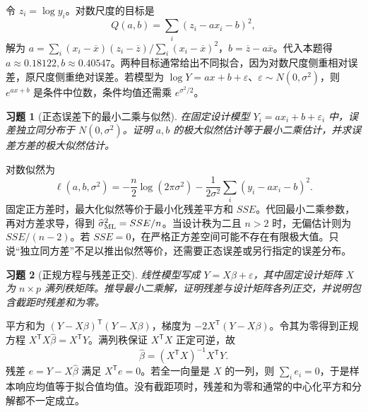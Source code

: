 \documentclass[UTF8,12pt,a4paper,fontset=fandol]{ctexart}
\newtheorem{exercise}{习题}[section]
\begin{document}
\begin{solve}\label{a:M-C26-1c}令 $z_i=\log y_i$。对数尺度的目标是\[Q(a,b)=\sum_i(z_i-ax_i-b)^2,\]解为 $a=\sum_i(x_i-\overline x)(z_i-\overline z)/\sum_i(x_i-\overline x)^2$，$b=\overline z-a\overline x$。代入本题得 $a\approx0.18122,b\approx0.40547$。两种目标通常给出不同拟合，因为对数尺度侧重相对误差，原尺度侧重绝对误差。若模型为 $\log Y=ax+b+\varepsilon$、$\varepsilon\sim N(0,\sigma^2)$，则 $e^{ax+b}$ 是条件中位数，条件均值还需乘 $e^{\sigma^2/2}$。\end{solve}

\begin{exercise}[正态误差下的最小二乘与似然]\label{q:M-C26-2d}
在固定设计模型 $Y_i=ax_i+b+\varepsilon_i$ 中，误差独立同分布于 $N(0,\sigma^2)$。证明 $a,b$ 的极大似然估计等于最小二乘估计，并求误差方差的极大似然估计。\par{}
\end{exercise}

\begin{solve}\label{a:M-C26-2d}对数似然为\[\ell(a,b,\sigma^2)=-\frac n2\log(2\pi\sigma^2)-\frac{1}{2\sigma^2}\sum_i(y_i-ax_i-b)^2.\]固定正方差时，最大化似然等价于最小化残差平方和 $SSE$。代回最小二乘参数，再对方差求导，得到 $\widehat\sigma^2_{\rm ML}=SSE/n$。当设计秩为二且 $n>2$ 时，无偏估计则为 $SSE/(n-2)$。若 $SSE=0$，在严格正方差空间可能不存在有限极大值。只说“独立同方差”不足以推出似然等价，还需要正态误差或另行指定的误差分布。\end{solve}

\begin{exercise}[正规方程与残差正交]\label{q:B16.1}
线性模型写成 $Y=X\beta+\varepsilon$，其中固定设计矩阵 $X$ 为 $n\times p$ 满列秩矩阵。推导最小二乘解，证明残差与设计矩阵各列正交，并说明包含截距时残差和为零。\par{}
\end{exercise}

\begin{solve}\label{a:B16.1}平方和为 $(Y-X\beta)^\mathsf T(Y-X\beta)$，梯度为 $-2X^\mathsf T(Y-X\beta)$。令其为零得到正规方程 $X^\mathsf TX\widehat\beta=X^\mathsf TY$。满列秩保证 $X^\mathsf TX$ 正定可逆，故\[\widehat\beta=(X^\mathsf TX)^{-1}X^\mathsf TY.\]残差 $e=Y-X\widehat\beta$ 满足 $X^\mathsf Te=0$。若全一向量是 $X$ 的一列，则 $\sum_ie_i=0$，于是样本响应均值等于拟合值均值。没有截距项时，残差和为零和通常的中心化平方和分解都不一定成立。\end{solve}
\end{document}
